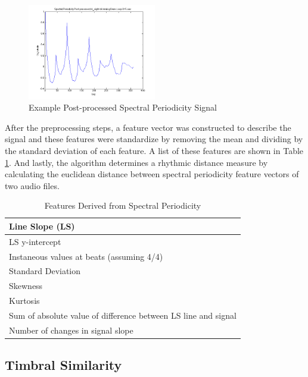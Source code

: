 \documentclass{article}
\begin{document}
\begin{figure}[h!]
  \centering
    \includegraphics[width=0.5\textwidth]{bs_post.png}
      \caption{Example Post-processed Spectral Periodicity Signal}	\label{fig:bs1_post}
\end{figure}

After the preprocessing steps, a feature vector was constructed to describe the signal and these features were standardize by removing the mean and dividing by the standard deviation of each feature. A list of these features are shown in Table \ref{tab:bs_feat}. And lastly, the algorithm determines a rhythmic distance measure by calculating the euclidean distance between spectral periodicity feature vectors of two audio files.

\begin{table}[h!]
  \begin{center}
    \begin{tabular}{| p{7.0cm} |}
    \hline
    Line Slope (LS) \\
    \hline
	LS y-intercept\\
	    \hline
	Instaneous values at beats (assuming 4/4) \\
	    \hline
	Standard Deviation \\
	    \hline
	Skewness \\
	    \hline
	Kurtosis \\
	    \hline
	Sum of absolute value of difference between LS line and signal \\
	    \hline
	Number of changes in signal slope \\    \hline
    \end{tabular}
  \end{center}
  \caption{Features Derived from Spectral Periodicity}\label{tab:bs_feat}
\end{table}
    

\subsection{Timbral Similarity}
\end{document}
